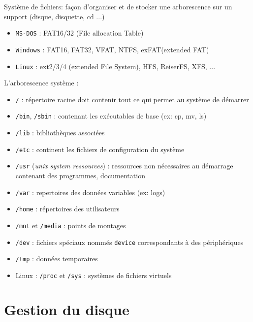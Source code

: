 \documentclass[french]{beamer}
\begin{document}
\begin{frame}
\begin{center}
Système de fichiers: façon d'organiser et de stocker une arborescence sur
un support (disque, disquette, cd ...)
\end{center}
    \begin{itemize}
    \item \texttt{MS-DOS} : FAT16/32 (File allocation Table)
    \item \texttt{Windows} : FAT16, FAT32, VFAT, NTFS, exFAT(extended FAT)
    \item \texttt{Linux} : ext2/3/4 (extended File System), HFS, ReiserFS, XFS, ...
    \end{itemize}
\end{frame}


\begin{frame}
L'arborescence système :
    \begin{itemize}
    \item \texttt{/} : répertoire racine doit contenir tout ce qui permet au système de démarrer
    \item \texttt{/bin}, \texttt{/sbin} : contenant les exécutables de base (ex: cp, mv, ls)
    \item \texttt{/lib} : bibliothèques associées 
    \item \texttt{/etc} : continent les fichiers de configuration du système
    \item \texttt{/usr} (\textit{unix system ressources}) : ressources non nécessaires au démarrage contenant des programmes, documentation
    \item \texttt{/var} : repertoires des données variables (ex: logs)
    \item \texttt{/home} : répertoires des utilisateurs
    \item \texttt{/mnt} et \texttt{/media} : points de montages
    \item \texttt{/dev} : fichiers spéciaux nommés \texttt{device} correspondants à des périphériques
    \item \texttt{/tmp} : données temporaires
    \item Linux : \texttt{/proc} et \texttt{/sys} : systèmes de fichiers virtuels
    \end{itemize}
\end{frame}

\section{Gestion du disque}
\frame{\tableofcontents[current]}
\end{document}
